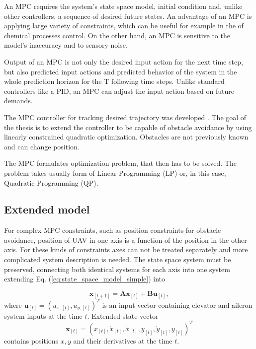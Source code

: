 \documentclass[a4paper,11pt,titlepage]{article}
\begin{document}
An MPC requires the system's state space model, initial condition and, unlike other controllers, a sequence of desired future states. An advantage of an MPC is applying large variety of constraints, which can be useful for example in the of chemical processes control. On the other hand, an MPC is sensitive to the model's inaccuracy and to sensory noise. 

Output of an MPC is not only the desired input action for the next time step, but also predicted input actions and predicted behavior of the system in the whole prediction horizon for the T following time steps. Unlike standard controllers like a PID, an MPC can adjust the input action based on future demands.

The MPC controller for tracking desired trajectory was developed \cite{tomas}. The goal of the thesis is to extend the controller to be capable of obstacle avoidance by using linearly constrained quadratic optimization. Obstacles are not previously known and can change position.

The MPC formulates optimization problem, that then has to be solved. The problem takes usually form of Linear Programming (LP) or, in this case, Quadratic Programming (QP).



\subsection{Extended model}		%
For complex MPC constraints, such as position constraints for obstacle avoidance, position of UAV in one axis is a function of the position in the other axis. For these kinds of constraints axes can not be treated separately and more complicated system description is needed. The state space system must be preserved, connecting both identical systems for each axis into one system extending Eq. (\ref{eq:state_space_model_simple}) into 

\begin{equation}
\label{eq:state_space_model_simple}
\textbf{x}_{[t+1]} = \textbf{A} \textbf{x}_{[t]} +\textbf{B} \textbf{u}_{[t]},
\end{equation}
where $\textbf{u}_{[t]} = (u_{x,[t]}, u_{y,[t]})^T$ is an input vector containing elevator and aileron system inputs at the time $t$. Extended state vector 
\begin{equation}
\textbf{x}_{[t]} = (x_{[t]}, \dot{x}_{[t]}, \ddot{x}_{[t]}, y_{[t]}, \dot{y}_{[t]}, \ddot{y}_{[t]})^T
\end{equation}
contains positions $x,y$ and their derivatives at the time $t$. 
\end{document}
